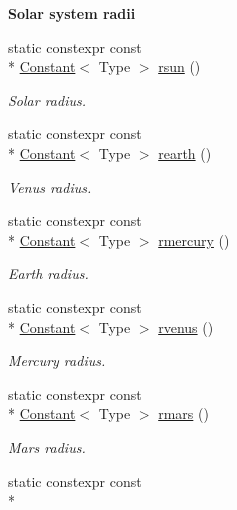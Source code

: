\begin{Indent}{\bf Solar system radii}\par
\begin{DoxyCompactItemize}
\item 
static constexpr const \\*
\hyperlink{exceptionmagrathea_1_1Constant}{Constant}$<$ Type $>$ \hyperlink{exceptionmagrathea_1_1Constants_a2db836cc95099270c76a4292c44e37e5}{rsun} ()
\begin{DoxyCompactList}\small\item\em Solar radius. \end{DoxyCompactList}\item 
static constexpr const \\*
\hyperlink{exceptionmagrathea_1_1Constant}{Constant}$<$ Type $>$ \hyperlink{exceptionmagrathea_1_1Constants_a7754120928a2a8dc4679e95e4376cd2b}{rearth} ()
\begin{DoxyCompactList}\small\item\em Venus radius. \end{DoxyCompactList}\item 
static constexpr const \\*
\hyperlink{exceptionmagrathea_1_1Constant}{Constant}$<$ Type $>$ \hyperlink{exceptionmagrathea_1_1Constants_af944ea6f927dc22db7750b1cc8c2a28a}{rmercury} ()
\begin{DoxyCompactList}\small\item\em Earth radius. \end{DoxyCompactList}\item 
static constexpr const \\*
\hyperlink{exceptionmagrathea_1_1Constant}{Constant}$<$ Type $>$ \hyperlink{exceptionmagrathea_1_1Constants_a0ba252273cdb125f137efb2f0015b3a2}{rvenus} ()
\begin{DoxyCompactList}\small\item\em Mercury radius. \end{DoxyCompactList}\item 
static constexpr const \\*
\hyperlink{exceptionmagrathea_1_1Constant}{Constant}$<$ Type $>$ \hyperlink{exceptionmagrathea_1_1Constants_afc87fe6a86c7095ee42d203cd2807308}{rmars} ()
\begin{DoxyCompactList}\small\item\em Mars radius. \end{DoxyCompactList}\item 
static constexpr const \\*

\end{DoxyCompactItemize}
\end{Indent}
